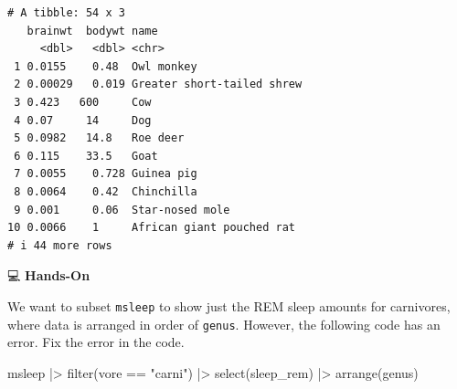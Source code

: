 \documentclass[
  letterpaper,
  DIV=11,
  numbers=noendperiod]{scrreprt}
\newenvironment{Shaded}{\begin{snugshade}}{\end{snugshade}}
\newcommand{\FunctionTok}[1]{\textcolor[rgb]{0.28,0.35,0.67}{#1}}
\newcommand{\NormalTok}[1]{\textcolor[rgb]{0.00,0.23,0.31}{#1}}
\newcommand{\SpecialCharTok}[1]{\textcolor[rgb]{0.37,0.37,0.37}{#1}}
\newcommand{\StringTok}[1]{\textcolor[rgb]{0.13,0.47,0.30}{#1}}
\begin{document}
\begin{tcolorbox}
\begin{verbatim}
# A tibble: 54 x 3
   brainwt  bodywt name                      
     <dbl>   <dbl> <chr>                     
 1 0.0155    0.48  Owl monkey                
 2 0.00029   0.019 Greater short-tailed shrew
 3 0.423   600     Cow                       
 4 0.07     14     Dog                       
 5 0.0982   14.8   Roe deer                  
 6 0.115    33.5   Goat                      
 7 0.0055    0.728 Guinea pig                
 8 0.0064    0.42  Chinchilla                
 9 0.001     0.06  Star-nosed mole           
10 0.0066    1     African giant pouched rat 
# i 44 more rows
\end{verbatim}

\end{tcolorbox}

💻 \textbf{Hands-On}

We want to subset \texttt{msleep} to show just the REM sleep amounts for
carnivores, where data is arranged in order of \texttt{genus}. However,
the following code has an error. Fix the error in the code.

\begin{Shaded}
\begin{Highlighting}[]
\NormalTok{msleep }\SpecialCharTok{|\textgreater{}}
  \FunctionTok{filter}\NormalTok{(vore }\SpecialCharTok{==} \StringTok{"carni"}\NormalTok{) }\SpecialCharTok{|\textgreater{}}
  \FunctionTok{select}\NormalTok{(sleep\_rem) }\SpecialCharTok{|\textgreater{}}
  \FunctionTok{arrange}\NormalTok{(genus)}
\end{Highlighting}
\end{Shaded}
\end{document}
